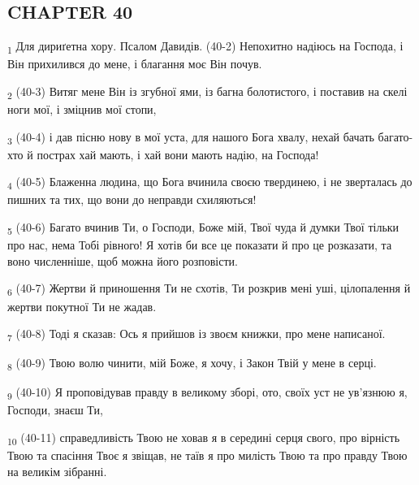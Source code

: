 \subsection{CHAPTER 40}
\begin{tcolorbox}
\textsubscript{1} Для дириґетна хору. Псалом Давидів. (40-2) Непохитно надіюсь на Господа, і Він прихилився до мене, і благання моє Він почув.
\end{tcolorbox}
\begin{tcolorbox}
\textsubscript{2} (40-3) Витяг мене Він із згубної ями, із багна болотистого, і поставив на скелі ноги мої, і зміцнив мої стопи,
\end{tcolorbox}
\begin{tcolorbox}
\textsubscript{3} (40-4) і дав пісню нову в мої уста, для нашого Бога хвалу, нехай бачать багато-хто й пострах хай мають, і хай вони мають надію, на Господа!
\end{tcolorbox}
\begin{tcolorbox}
\textsubscript{4} (40-5) Блаженна людина, що Бога вчинила своєю твердинею, і не зверталась до пишних та тих, що вони до неправди схиляються!
\end{tcolorbox}
\begin{tcolorbox}
\textsubscript{5} (40-6) Багато вчинив Ти, о Господи, Боже мій, Твої чуда й думки Твої тільки про нас, нема Тобі рівного! Я хотів би все це показати й про це розказати, та воно численніше, щоб можна його розповісти.
\end{tcolorbox}
\begin{tcolorbox}
\textsubscript{6} (40-7) Жертви й приношення Ти не схотів, Ти розкрив мені уші, цілопалення й жертви покутної Ти не жадав.
\end{tcolorbox}
\begin{tcolorbox}
\textsubscript{7} (40-8) Тоді я сказав: Ось я прийшов із звоєм книжки, про мене написаної.
\end{tcolorbox}
\begin{tcolorbox}
\textsubscript{8} (40-9) Твою волю чинити, мій Боже, я хочу, і Закон Твій у мене в серці.
\end{tcolorbox}
\begin{tcolorbox}
\textsubscript{9} (40-10) Я проповідував правду в великому зборі, ото, своїх уст не ув'язнюю я, Господи, знаєш Ти,
\end{tcolorbox}
\begin{tcolorbox}
\textsubscript{10} (40-11) справедливість Твою не ховав я в середині серця свого, про вірність Твою та спасіння Твоє я звіщав, не таїв я про милість Твою та про правду Твою на великім зібранні.
\end{tcolorbox}
